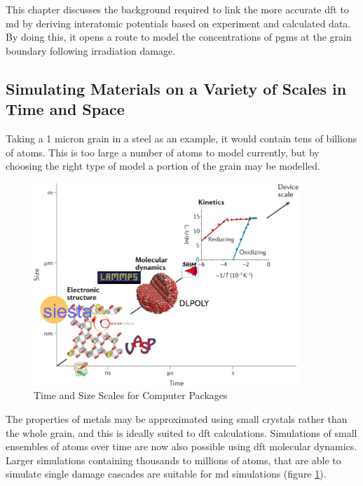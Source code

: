 This chapter discusses the background required to link the more accurate \acrshort{dft} to \acrshort{md} by deriving  interatomic potentials based on experiment and calculated data.  By doing this, it opens a route to model the concentrations of \acrshort{pgm}s at the grain boundary following irradiation damage.



\FloatBarrier
\subsection{Simulating Materials on a Variety of Scales in Time and Space}

Taking a 1 micron grain in a steel as an example, it would contain tens of billions of atoms.  This is too large a number of atoms to model currently, but by choosing the right type of model a portion of the grain may be modelled.


\begin{figure}[htbp]
  \begin{center}
    \includegraphics[width=10.0cm]{chapters/interatomic_potential_fitting/images/scale.png}
    \caption{Time and Size Scales for Computer Packages \cite{scalediagram}}
    \label{fig:timesizascalesmodelling}
  \end{center}
\end{figure}

The properties of metals may be approximated using small crystals rather than the whole grain, and this is ideally suited to \acrshort{dft} calculations.  Simulations of small ensembles of atoms over time are now also possible using \acrshort{dft} molecular dynamics.  Larger simulations containing thousands to millions of atoms, that are able to simulate single damage cascades are suitable for \acrshort{md} simulations (figure \ref{fig:timesizascalesmodelling}). 




